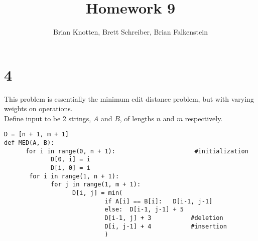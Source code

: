 \documentclass[letterpaper,notitlepage,twoside]{article}
\begin{document}
\title{Homework 9}
\author{Brian Knotten, Brett Schreiber, Brian Falkenstein}
\maketitle

\section*{4}
This problem is essentially the minimum edit distance problem, but with varying weights on operations. \\
Define input to be 2 strings, $A$ and $B$, of lengths $n$ and $m$ respectively.
\begin{verbatim}
D = [n + 1, m + 1]
def MED(A, B):
      for i in range(0, n + 1):                      #initialization 
             D[0, i] = i
             D[i, 0] = i
       for i in range(1, n + 1):
             for j in range(1, m + 1):
                   D[i, j] = min(
                            if A[i] == B[i]:   D[i-1, j-1]
                            else:  D[i-1, j-1] + 5
                            D[i-1, j] + 3           #deletion
                            D[i, j-1] + 4           #insertion
                            )
\end{verbatim}
\end{document}
